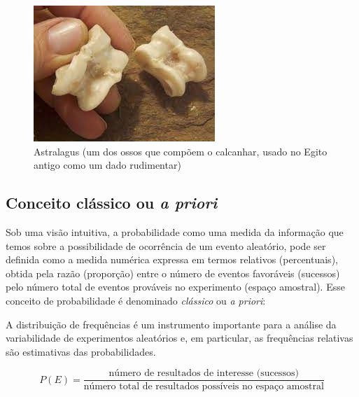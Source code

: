 \documentclass[
]{book}
\begin{document}
\begin{figure}

{\centering \includegraphics[width=0.8\linewidth]{images4/astralagus} 

}

\caption{Astralagus (um dos ossos que compõem o calcanhar, usado no Egito antigo como um dado rudimentar)}\label{fig:unnamed-chunk-55}
\end{figure}

\hypertarget{conceito-cluxe1ssico-ou-a-priori}{%
\subsection{\texorpdfstring{Conceito clássico ou \emph{a priori}}{Conceito clássico ou a priori}}\label{conceito-cluxe1ssico-ou-a-priori}}

Sob uma visão intuitiva, a probabilidade como uma medida da informação que temos sobre a possibilidade de ocorrência de um evento aleatório, pode ser definida como a medida numérica expressa em termos relativos (percentuais), obtida pela razão (proporção) entre o número de eventos favoráveis (sucessos) pelo número total de eventos prováveis no experimento (espaço amostral). Esse conceito de probabilidade é denominado \emph{clássico} ou \emph{a priori}:

\hfill\break

A distribuição de frequências é um instrumento importante para a análise da variabilidade de experimentos aleatórios e, em particular, as frequências relativas são estimativas das probabilidades.

\hfill\break

\[
P(E)= \frac{\text{número de resultados de interesse (sucessos)}}{\text{número total de resultados possíveis no espaço amostral}}
\]
\end{document}
